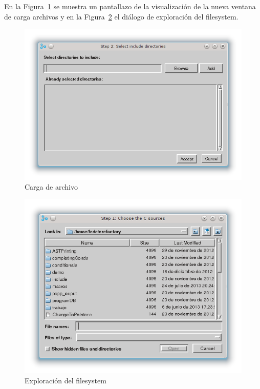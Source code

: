 \documentclass[a4paper,oneside,12pt]{article}
\begin{document}
En la Figura~\ref{carga_archivo} se muestra un pantallazo de la visualizaci\'on de la nueva ventana de carga archivos y en la Figura~\ref{busqueda_archivo} el di\'alogo de exploraci\'on del filesystem.

\begin{figure}[h!]
  \centering
    \includegraphics[scale=0.50]{images/codigo_modificado/include.png}
     \caption{Carga de archivo}
     \label{carga_archivo}
\end{figure}

\begin{figure}[h!]
  \centering
    \includegraphics[scale=0.50]{images/codigo_modificado/open_file.png}
     \caption{Exploraci\'on del filesystem}
     \label{busqueda_archivo}
\end{figure}
\end{document}
